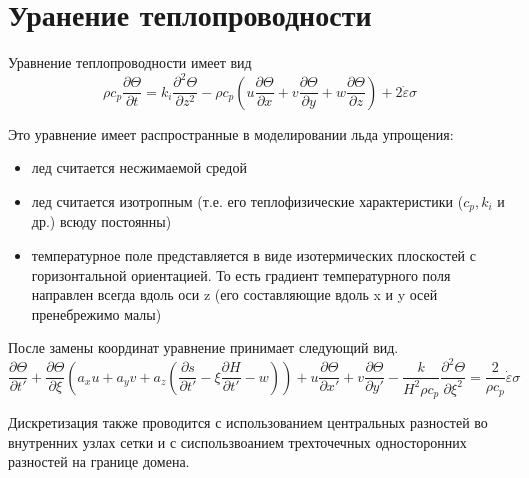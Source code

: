 \section*{Уранение теплопроводности}
Уравнение теплопроводности имеет вид
\begin{equation*}
    \rho
    c_p
    \frac
        {\partial \Theta}
        {\partial t}
    =
    k_i
    \frac
        {\partial^2 \Theta}
        {\partial z^2}
    -
    \rho
    c_p
    \left(
        u
        \frac
            {\partial \Theta}
            {\partial x}
        +
        v
        \frac
            {\partial \Theta}
            {\partial y}
        +
        w
        \frac
            {\partial \Theta}
            {\partial z}
    \right)
    +
    2
    \dot{\varepsilon}
    \sigma
\end{equation*}

Это уравнение имеет распространные в моделировании льда упрощения:
\begin{itemize}
    \item лед считается несжимаемой средой
    \item лед считается изотропным (т.е. его теплофизические
    характеристики ($c_p, k_i$ и др.) всюду постоянны)
    \item температурное поле представляется в виде изотермических 
    плоскостей с горизонтальной ориентацией. То есть градиент
    температурного поля направлен всегда вдоль оси z (его составляющие
    вдоль x и y осей пренебрежимо малы)
\end{itemize}

После замены координат уравнение принимает следующий вид.
\begin{equation*}
    \frac   
        {\partial \Theta}
        {\partial t'}
    +
    \frac   
        {\partial \Theta}
        {\partial \xi}
    \left(
        a_x
        u
        +
        a_y
        v
        +
        a_z
        \left(
            \frac   
                {\partial s}
                {\partial t'}
            -
            \xi
            \frac   
                {\partial H}
                {\partial t'}
            -
            w
        \right)
    \right)
    +
    u
    \frac   
        {\partial \Theta}
        {\partial x'}
    +
    v
    \frac   
        {\partial \Theta}
        {\partial y'}
    -
    \frac
        {k}
        {H^2 \rho c_p}
    \frac   
        {\partial^2 \Theta}
        {\partial \xi^2}
    =
    \frac
        {2}
        {\rho c_p}
    \dot{\varepsilon}
    \sigma
\end{equation*}

Дискретизация также проводится с использованием центральных
разностей во внутренних узлах сетки и с сиспользвоанием трехточечных
односторонних разностей на границе домена.
